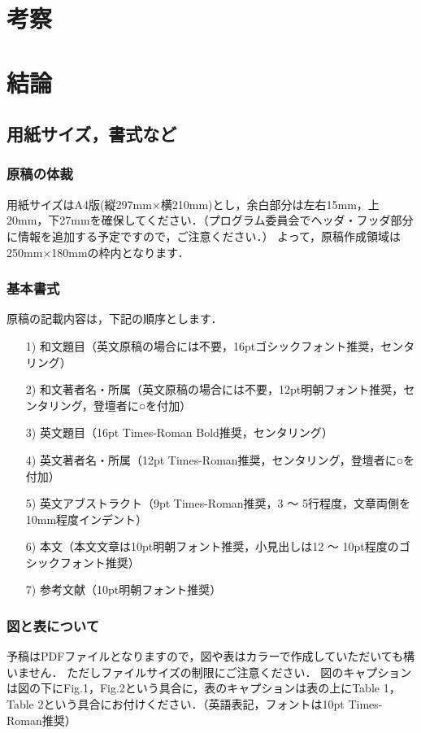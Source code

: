 \documentclass[a4j,fleqn,dvipdfmx,uplatex]{jsarticle}
\begin{document}
\section{考察}


\section{結論}

\subsection{用紙サイズ，書式など}
\subsubsection{原稿の体裁}
用紙サイズはA4版(縦297mm$\times$横210mm)とし，余白部分は左右15mm，上20mm，下27mmを確保してください．（プログラム委員会でヘッダ・フッダ部分に情報を追加する予定ですので，ご注意ください．）
よって，原稿作成領域は250mm$\times$180mmの枠内となります．
%
\subsubsection{基本書式}
原稿の記載内容は，下記の順序とします．
\begin{enumerate}
\setlength{\parskip}{0cm} %
\setlength{\itemsep}{0cm} %
\item[1)] 和文題目（英文原稿の場合には不要，16ptゴシックフォント推奨，センタリング）
\item[2)] 和文著者名・所属（英文原稿の場合には不要，12pt明朝フォント推奨，センタリング，登壇者に○を付加）
\item[3)] 英文題目（16pt Times-Roman Bold推奨，センタリング）
\item[4)] 英文著者名・所属（12pt Times-Roman推奨，センタリング，登壇者に○を付加）
\item[5)] 英文アブストラクト（9pt Times-Roman推奨，3 〜 5行程度，文章両側を10mm程度インデント）
\item[6)] 本文（本文文章は10pt明朝フォント推奨，小見出しは12 〜 10pt程度のゴシックフォント推奨）
\item[7)] 参考文献（10pt明朝フォント推奨）
\end{enumerate}
\subsubsection{図と表について}
予稿はPDFファイルとなりますので，図や表はカラーで作成していただいても構いません．
ただしファイルサイズの制限にご注意ください．
図のキャプションは図の下にFig.1，Fig.2という具合に，表のキャプションは表の上にTable 1，Table 2という具合にお付けください．（英語表記，フォントは10pt Times-Roman推奨）
\end{document}
